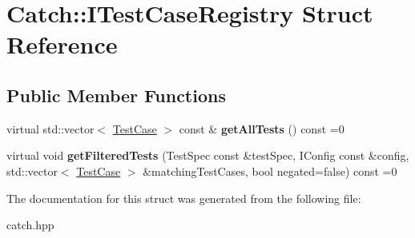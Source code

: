 \hypertarget{struct_catch_1_1_i_test_case_registry}{}\section{Catch\+:\+:I\+Test\+Case\+Registry Struct Reference}
\label{struct_catch_1_1_i_test_case_registry}
\subsection*{Public Member Functions}
\begin{DoxyCompactItemize}
\item 
\mbox{\label{struct_catch_1_1_i_test_case_registry_ad6e4d4a621655123f73ae98cfeda063d}} 
virtual std\+::vector$<$ \hyperlink{class_catch_1_1_test_case}{Test\+Case} $>$ const  \& {\bfseries get\+All\+Tests} () const =0
\item 
\mbox{\label{struct_catch_1_1_i_test_case_registry_adde9e447d842916c62a11b433d09c517}} 
virtual void {\bfseries get\+Filtered\+Tests} (Test\+Spec const \&test\+Spec, I\+Config const \&config, std\+::vector$<$ \hyperlink{class_catch_1_1_test_case}{Test\+Case} $>$ \&matching\+Test\+Cases, bool negated=false) const =0
\end{DoxyCompactItemize}


The documentation for this struct was generated from the following file\+:\begin{DoxyCompactItemize}
\item 
catch.\+hpp\end{DoxyCompactItemize}
